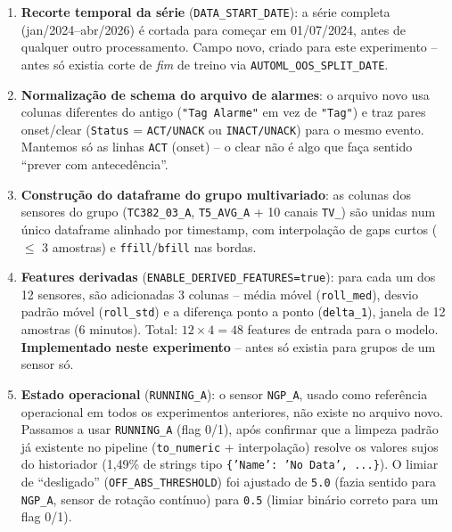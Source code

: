 \documentclass[11pt,a4paper]{article}
\begin{document}
\begin{enumerate}[leftmargin=*]

\item \textbf{Recorte temporal da série} (\texttt{DATA\_START\_DATE}):
  a série completa (jan/2024--abr/2026) é cortada para começar em
  01/07/2024, antes de qualquer outro processamento. Campo novo, criado
  para este experimento -- antes só existia corte de \emph{fim} de treino
  via \texttt{AUTOML\_OOS\_SPLIT\_DATE}.

\item \textbf{Normalização de schema do arquivo de alarmes}: o arquivo
  novo usa colunas diferentes do antigo (\texttt{"Tag Alarme"} em vez de
  \texttt{"Tag"}) e traz pares onset/clear (\texttt{Status} =
  \texttt{ACT/UNACK} ou \texttt{INACT/UNACK}) para o mesmo evento. Mantemos
  só as linhas \texttt{ACT} (onset) -- o clear não é algo que faça sentido
  ``prever com antecedência''.

\item \textbf{Construção do dataframe do grupo multivariado}: as colunas
  dos sensores do grupo (\texttt{TC382\_03\_A}, \texttt{T5\_AVG\_A} + 10
  canais \texttt{TV\_}) são unidas num único dataframe alinhado por
  timestamp, com interpolação de gaps curtos ($\leq$ 3 amostras) e
  \texttt{ffill}/\texttt{bfill} nas bordas.

\item \textbf{Features derivadas} (\texttt{ENABLE\_DERIVED\_FEATURES=true}):
  para cada um dos 12 sensores, são adicionadas 3 colunas -- média móvel
  (\texttt{roll\_med}), desvio padrão móvel (\texttt{roll\_std}) e a
  diferença ponto a ponto (\texttt{delta\_1}), janela de 12 amostras
  (6 minutos). Total: $12 \times 4 = 48$ features de entrada para o modelo.
  \textbf{Implementado neste experimento} -- antes só existia para grupos
  de um sensor só.

\item \textbf{Estado operacional} (\texttt{RUNNING\_A}): o sensor
  \texttt{NGP\_A}, usado como referência operacional em todos os
  experimentos anteriores, não existe no arquivo novo. Passamos a usar
  \texttt{RUNNING\_A} (flag 0/1), após confirmar que a limpeza padrão já
  existente no pipeline (\texttt{to\_numeric} + interpolação) resolve os
  valores sujos do historiador (1,49\% de strings tipo
  \texttt{\{'Name': 'No Data', ...\}}). O limiar de ``desligado''
  (\texttt{OFF\_ABS\_THRESHOLD}) foi ajustado de \texttt{5.0} (fazia
  sentido para \texttt{NGP\_A}, sensor de rotação contínuo) para
  \texttt{0.5} (limiar binário correto para um flag 0/1).


\end{enumerate}
\end{document}
